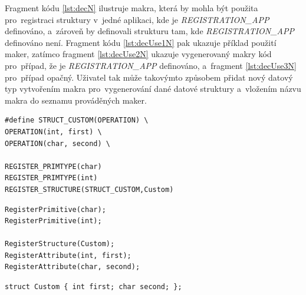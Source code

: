 \documentclass[11pt,twoside,a4paper]{book}
\begin{document}
Fragment kódu \ref{lst:decN} ilustruje makra, která by mohla být použita pro~registraci struktury v~jedné aplikaci, kde je \textit{REGISTRATION\_APP} definováno, a~zároveň by definovali strukturu tam, kde \textit{REGISTRATION\_APP} definováno není. Fragment kódu \ref{lst:decUse1N} pak ukazuje příklad použití maker, zatímco fragment \ref{lst:decUse2N} ukazuje vygenerovaný makry kód pro~případ, že je \textit{REGISTRATION\_APP} definováno, a~fragment \ref{lst:decUse3N} pro~případ opačný. Uživatel tak může takovýmto způsobem přidat nový datový typ vytvořením makra pro~vygenerování dané datové struktury a~vložením názvu makra do seznamu prováděných maker.

\begin{lstlisting}[float,frame=single,caption={Ukázka makra, které vytvoří/zaregistruje určitou strukturu.},label=lst:decUse1N]
#define STRUCT_CUSTOM(OPERATION) \
OPERATION(int, first) \
OPERATION(char, second) \

REGISTER_PRIMTYPE(char)
REGISTER_PRIMTYPE(int)
REGISTER_STRUCTURE(STRUCT_CUSTOM,Custom)
\end{lstlisting}

\begin{lstlisting}[float,frame=single,caption=Kód vygenerovaný makrem\, který zaregistruje strukturu.,label=lst:decUse2N]
RegisterPrimitive(char);
RegisterPrimitive(int);

RegisterStructure(Custom);
RegisterAttribute(int, first);
RegisterAttribute(char, second);
\end{lstlisting}

\begin{lstlisting}[float,frame=single,caption=Deklarace struktury vygenerovaná pomocí makra.,label=lst:decUse3N]
struct Custom { int first; char second; };
\end{lstlisting}
 
\end{document}
